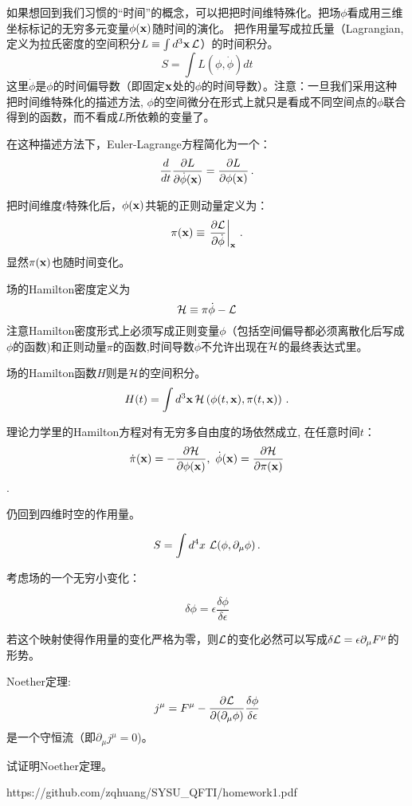 \documentclass[CJK]{beamer}
\begin{document}
\begin{frame}
\bch
如果想回到我们习惯的“时间”的概念，可以把把时间维特殊化。把场$\phi$看成用三维坐标标记的无穷多元变量$\phi(\mathbf{x})$随时间的演化。
把作用量写成拉氏量（Lagrangian, 定义为拉氏密度的空间积分$L \equiv \int d^3\mathbf{x}\, \mathcal{L}$）的时间积分。
$$S = \int L(\phi,\dot\phi) dt$$
这里$\dot\phi$是$\phi$的时间偏导数（即固定$\mathbf{x}$处的$\phi$的时间导数）。注意：一旦我们采用这种把时间维特殊化的描述方法, $\phi$的空间微分在形式上就只是看成不同空间点的$\phi$联合得到的函数，而不看成$L$所依赖的变量了。

在这种描述方法下，Euler-Lagrange方程简化为一个：
$$\frac{d}{dt} \frac{\partial L}{\partial \dot\phi(\mathbf{x})} = \frac{\partial L}{\partial \phi(\mathbf{x})}\,.$$

\skipline

\ech
\end{frame}


\begin{frame}
\bch
把时间维度$t$特殊化后，$\phi(\mathbf{x})$共轭的正则动量定义为：
$$ \pi(\mathbf{x}) \equiv \left.\frac{\partial\mathcal{L}}{\partial\dot\phi}\right\vert_{\mathbf{x}} \,.$$
显然$\pi(\mathbf{x})$也随时间变化。

场的Hamilton密度定义为
$$ \mathcal{H} \equiv \pi \dot\phi- \mathcal{L} $$
注意Hamilton密度形式上必须写成正则变量$\phi$（包括空间偏导都必须离散化后写成$\phi$的函数)和正则动量$\pi$的函数,时间导数$\dot\phi$不允许出现在$\mathcal{H}$的最终表达式里。

场的Hamilton函数$H$则是$\mathcal{H}$的空间积分。
$$ H(t) = \int d^3\mathbf{x}\, \mathcal{H}\left(\phi(t,\mathbf{x}), \pi(t,\mathbf{x})\right)\,.$$
\ech
\end{frame}

\begin{frame}
\bch
理论力学里的Hamilton方程对有无穷多自由度的场依然成立, 在任意时间$t$：
$$\dot\pi(\mathbf{x}) = -\frac{\partial \mathcal{H}}{\partial\phi(\mathbf{x})},\ \dot\phi(\mathbf{x}) = \frac{\partial\mathcal{H}}{\partial\pi(\mathbf{x})}$$.
\ech
\end{frame}

\begin{frame}
\bch
仍回到四维时空的作用量。

$$S = \int d^4x\ \mathcal{L}(\phi, \partial_\mu\phi)\,.$$

考虑场的一个无穷小变化：

$$\delta \phi = \epsilon \frac{\delta\phi}{\delta\epsilon}$$

若这个映射使得作用量的变化严格为零，则$\mathcal{L}$的变化必然可以写成$ \delta \mathcal{L} = \epsilon \partial_\mu F^\mu$的形势。

Noether定理: $$j^\mu = F^\mu - \frac{\partial\mathcal{L}}{\partial (\partial_\mu\phi)} \frac{\delta\phi}{\delta\epsilon}$$ 是一个守恒流（即$\partial_\mu j^\mu = 0$)。

\ech
\end{frame}

\begin{frame}
\bch
试证明Noether定理。
\ech
\end{frame}

\begin{frame}
\bch
https://github.com/zqhuang/SYSU_QFTI/homework1.pdf
\ech
\end{frame}
\end{document}
